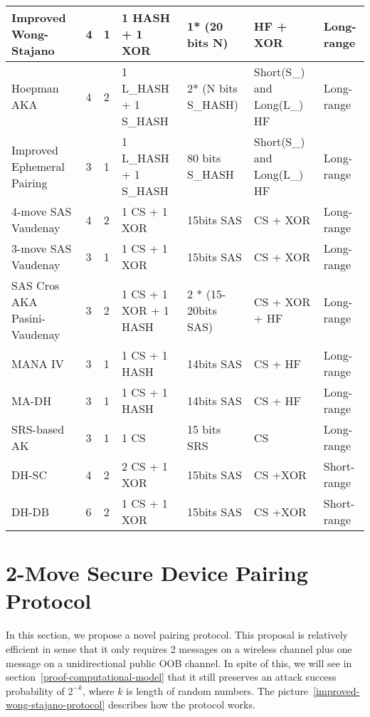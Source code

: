 \begin{table}[ht]
{\begin{tabular}{ | p{2cm} | p{1.4cm} | p{1.4cm} | p{2cm} | p{2.2cm} | p{2cm} | p{2cm}| }
Improved Wong-Stajano & 4	& 1	& 1 HASH + 1 XOR	 & 1* (20 bits N) &	 HF + XOR & Long-range \\ \hline 

Hoepman AKA & 4	& 2 &	 1 L\_HASH + 1 S\_HASH & 	2* (N bits S\_HASH) &	 Short(S\_) and Long(L\_) HF & Long-range \\ \hline 

Improved	Ephemeral Pairing & 3 &	 1 &	 1 L\_HASH + 1 S\_HASH &	80 bits S\_HASH & Short(S\_) and Long(L\_) HF & Long-range \\ \hline 
 
4-move SAS Vaudenay & 4	& 2 & 1 CS + 1 XOR & 15bits SAS	& CS + XOR & Long-range\\ \hline 

3-move SAS Vaudenay & 3	& 1 & 1 CS + 1 XOR & 15bits SAS	& CS + XOR & Long-range\\ \hline 
 																				
SAS Cros AKA Pasini-Vaudenay &	3 &	2 &	1 CS + 1 XOR + 1 HASH & 2 * (15-20bits SAS) & CS + XOR + HF & Long-range\\ \hline 

MANA IV & 3 & 1 & 1 CS + 1 HASH & 14bits SAS & CS + HF & Long-range\\ \hline 

MA-DH & 3 &	1 &	1 CS + 1 HASH & 14bits SAS & CS + HF & Long-range \\ \hline 

 SRS-based AK & 3 & 1 &  1 CS &	 15 bits SRS &	 CS & Long-range \\\hline 

DH-SC & 4 &	2 &	2 CS + 1 XOR & 15bits SAS & CS +XOR & Short-range\\ \hline 

DH-DB & 6 &	2 &	1 CS + 1 XOR & 15bits SAS & CS +XOR & Short-range\\ \hline 
\end{tabular}
}
\end{table}

\section{2-Move Secure Device Pairing Protocol}\label{chap42move}

In this section, we propose a novel pairing protocol. This proposal is relatively efficient in sense that it only requires 2 messages on a wireless channel plus one message on a unidirectional public OOB channel. In spite of this, we will see in section~\ref{proof-computational-model} that it still preserves an attack success probability of $2^{-k}$, where $k$ is length of random numbers. The picture~\ref{improved-wong-stajano-protocol} describes how the protocol works. 

